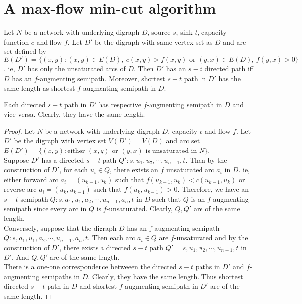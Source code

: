 \section{A max-flow min-cut algorithm}
\begin{theorem}
	Let $N$ be a network with underlying digraph $D$, source $s$, sink $t$, capacity function $c$ and flow $f$. Let $D'$ be the digraph with same vertex set as $D$ and arc set defined by $E(D') = \{ (x,y) : (x,y) \in E(D),\ c(x,y) > f(x,y) \text{ or } (y,x) \in E(D),\ f(y,x) > 0 \}$. ie, $D'$ has only the unsaturated arcs of $D$. Then $D'$ has an $s-t$ directed path iff $D$ has an $f$-augmenting semipath. Moreover, shortest $s-t$ path in $D'$ has the same length as shortest $f$-augmenting semipath in $D$.
\end{theorem}
\begin{synopsis}
	Each directed $s-t$ path in $D'$ has respective $f$-augmenting semipath in $D$ and vice versa. Clearly, they have the same length.
\end{synopsis}
\begin{proof}
	Let $N$ be a network with underlying digraph $D$, capacity $c$ and flow $f$. Let $D'$ be the digraph with vertex set $V(D') = V(D)$ and arc set $E(D') = \{ (x,y) : \text{either }(x,y) \text{ or } (y,x) \text{ is unsaturated in } N \}$.\\

	Suppose $D'$ has a directed $s-t$ path $Q' : s,u_1,u_2,\cdots,u_{n-1},t$. Then by the construction of $D'$, for each $u_i \in Q$, there exists an $f$ unsaturated arc $a_i$ in $D$. ie, either forward arc $a_i = (u_{k-1},u_k)$ such that $f(u_{k-1},u_k) < c(u_{k-1},u_k)$ or reverse arc $a_i = (u_k,u_{k-1})$ such that $f(u_k,u_{k-1}) > 0$. Therefore, we have an $s-t$ semipath $Q : s,a_1,u_1,a_2,\cdots,u_{n-1},a_n,t$ in $D$ such that $Q$ is an $f$-augmenting semipath since every arc in $Q$ is $f$-unsaturated. Clearly, $Q,Q'$ are of the same length.\\

	Conversely, suppose that the digraph $D$ has an $f$-augmenting semipath $Q : s,a_1,u_1,a_2,\cdots,u_{n-1},a_n,t$. Then each arc $a_i \in Q$ are $f$-unsaturated and by the construction of $D'$, there exists a directed $s-t$ path $Q' = s,u_1,u_2,\cdots,u_{n-1},t$ in $D'$. And $Q,Q'$ are of the same length.\\

	There is a one-one correspondence betweeen the directed $s-t$ paths in $D'$ and $f$-augmenting semipaths in $D$. Clearly, they have the same length. Thus shortest directed $s-t$ path in $D$ and shortest $f$-augmenting semipath in $D'$ are of the same length.
\end{proof}
